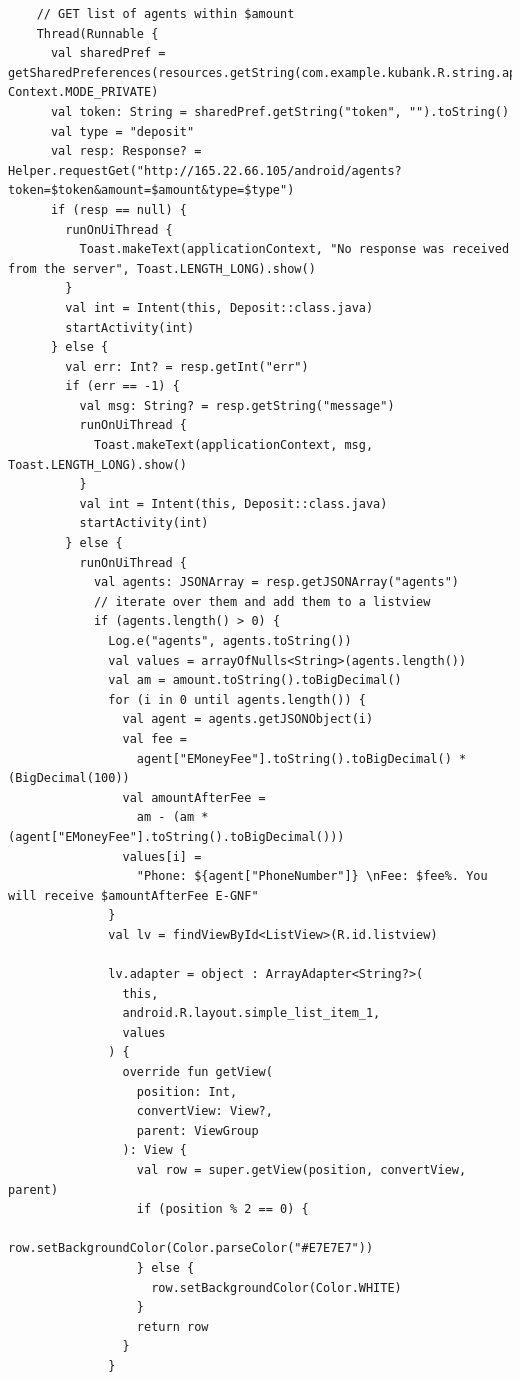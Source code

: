\documentclass[11pt, a4paper]{article}
\begin{document}
\begin{appendices}
\begin{lstlisting}
    // GET list of agents within $amount
    Thread(Runnable {
      val sharedPref = getSharedPreferences(resources.getString(com.example.kubank.R.string.app_name), Context.MODE_PRIVATE)
      val token: String = sharedPref.getString("token", "").toString()
      val type = "deposit"
      val resp: Response? = Helper.requestGet("http://165.22.66.105/android/agents?token=$token&amount=$amount&type=$type")
      if (resp == null) {
        runOnUiThread {
          Toast.makeText(applicationContext, "No response was received from the server", Toast.LENGTH_LONG).show()
        }
        val int = Intent(this, Deposit::class.java)
        startActivity(int)
      } else {
        val err: Int? = resp.getInt("err")
        if (err == -1) {
          val msg: String? = resp.getString("message")
          runOnUiThread {
            Toast.makeText(applicationContext, msg, Toast.LENGTH_LONG).show()
          }
          val int = Intent(this, Deposit::class.java)
          startActivity(int)
        } else {
          runOnUiThread {
            val agents: JSONArray = resp.getJSONArray("agents")
            // iterate over them and add them to a listview
            if (agents.length() > 0) {
              Log.e("agents", agents.toString())
              val values = arrayOfNulls<String>(agents.length())
              val am = amount.toString().toBigDecimal()
              for (i in 0 until agents.length()) {
                val agent = agents.getJSONObject(i)
                val fee =
                  agent["EMoneyFee"].toString().toBigDecimal() * (BigDecimal(100))
                val amountAfterFee =
                  am - (am * (agent["EMoneyFee"].toString().toBigDecimal()))
                values[i] =
                  "Phone: ${agent["PhoneNumber"]} \nFee: $fee%. You will receive $amountAfterFee E-GNF"
              }
              val lv = findViewById<ListView>(R.id.listview)

              lv.adapter = object : ArrayAdapter<String?>(
                this,
                android.R.layout.simple_list_item_1,
                values
              ) {
                override fun getView(
                  position: Int,
                  convertView: View?,
                  parent: ViewGroup
                ): View {
                  val row = super.getView(position, convertView, parent)
                  if (position % 2 == 0) {
                    row.setBackgroundColor(Color.parseColor("#E7E7E7"))
                  } else {
                    row.setBackgroundColor(Color.WHITE)
                  }
                  return row
                }
              }


\end{lstlisting}
\end{appendices}
\end{document}
